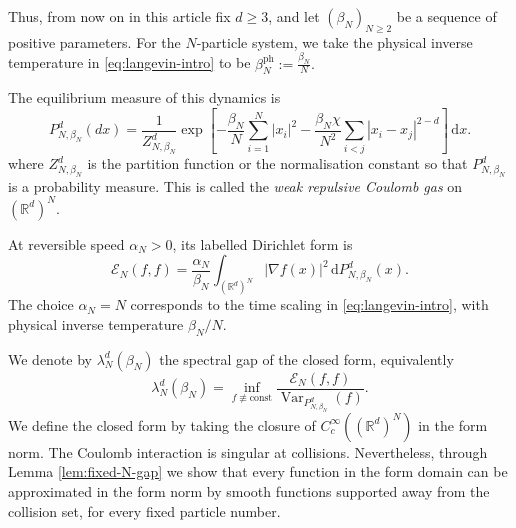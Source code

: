 \documentclass[12pt,reqno,letterpaper]{amsart}
\theoremstyle{definition}
\theoremstyle{remark}
\numberwithin{equation}{section}
\newcommand{\R}{\mathbb R}
\newcommand{\dd}{\,\mathrm d}
\newcommand{\be}{\beta}
\newcommand{\al}{\alpha}
\newcommand{\cE}{\mathcal E}
\newcommand{\Var}{\operatorname{Var}}
\begin{document}

Thus, from now on in this article fix \( d\ge3\), and let \((\be_N)_{N\ge2}\) be a sequence of positive parameters. For the \(N\)-particle system, we take the physical inverse
temperature in \eqref{eq:langevin-intro} to be
\( \beta_N^{\mathrm{ph}}:=\frac{\be_N}{N}.
\)

The equilibrium measure of this dynamics is 
\begin{equation}\label{eq:original-law}
 P_{N,\be_N}^{d}(dx)
 =\frac1{Z_{N,\be_N}^{d}}
 \exp\!\left[-\frac{\be_N}{N}\sum_{i=1}^N|x_i|^2
 -\frac{\be_N\chi}{N^2}\sum_{i<j}|x_i-x_j|^{2-d}\right]\dd x.
\end{equation}
where $Z_{N,\be_N}^{d}$ is the partition function or the normalisation constant so that $P_{N,\be_N}^{d}$ is a probability measure.  This is called the \emph{weak repulsive Coulomb gas} on \((\R^d)^N\). 

At reversible speed \(\al_N>0\), its labelled Dirichlet form is
\[
 \cE_N(f,f)
 =
 \frac{\al_N}{\be_N}
 \int_{(\R^d)^N}|\nabla f(x)|^2
 \dd P_{N,\be_N}^{d}(x).
\]
The choice \(\al_N=N\) corresponds to the time scaling in
\eqref{eq:langevin-intro}, with physical inverse temperature
\(\be_N/N\).

We denote by \(\lambda_N^{d}(\be_N)\) the spectral gap of the closed form,
equivalently
\begin{equation*}
 \lambda_N^{d}(\be_N)
 =\inf_{f\not\equiv\mathrm{const}}
 \frac{\cE_N(f,f)}{\Var_{P_{N,\be_N}^{d}}(f)}.
\end{equation*}
We define the closed form by taking the closure of \(C_c^\infty((\R^d)^N)\) in the form norm.
The Coulomb interaction is singular at
collisions. Nevertheless, through Lemma \ref{lem:fixed-N-gap} we show that every
function in the form domain can be approximated in the form norm by smooth
functions supported away from the collision set, for every fixed particle number.
\end{document}
